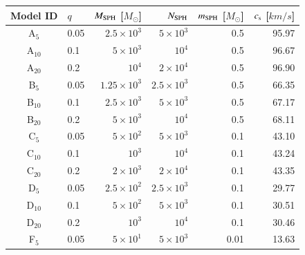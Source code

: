 \begin{table}[!h]
	\centering
	\renewcommand{\arraystretch}{0.95}
	\setlength{\tabcolsep}{4pt}
	\begin{tabular}{clrrrr}
		\hline
		\rowcolor[gray]{0.8}
		\textbf{Model ID} & $q$ & $M_{\rm SPH}$ [$M_\odot$] & $N_{\rm SPH}$ & $m_{\rm SPH}$ [$M_\odot$] & $c_{\rm s}$ [$km/s$]\\
		\hline
		
		\rowcolor[gray]{1}
		A$_{5}$ & 0.05  & $2.5 \times 10^3$  & $5 \times 10^3$  & 0.5  & 95.97 \\
		
		\rowcolor[gray]{1}
		A$_{10}$ & 0.1  & $5 \times 10^3$  & $10^4$  & 0.5  & 96.67 \\
		
		\rowcolor[gray]{1}
		A$_{20}$ & 0.2  & $ 10^4$  & $2 \times 10^4$  & 0.5  & 96.90 \\
		
		\rowcolor[gray]{0.9}
		B$_{5}$ & 0.05  & $1.25 \times 10^3$  & $2.5 \times 10^3$  & 0.5  & 66.35 \\
		
		\rowcolor[gray]{0.9}
		B$_{10}$ & 0.1  & $2.5 \times 10^3$  & $5 \times 10^3$  & 0.5  & 67.17 \\
		
		\rowcolor[gray]{0.9}
		B$_{20}$ & 0.2  & $5 \times 10^3$  & $10^4$  & 0.5  & 68.11 \\
		
		\rowcolor[gray]{1}
		C$_{5}$ & 0.05  & $5 \times 10^2$  & $5 \times 10^3$  & 0.1  & 43.10 \\
		
		\rowcolor[gray]{1}
		C$_{10}$ & 0.1  & $10^3$  & $10^4$  & 0.1  & 43.24 \\
		
		\rowcolor[gray]{1}
		C$_{20}$ & 0.2  & $2 \times 10^3$  & $2 \times 10^4$  & 0.1  & 43.35 \\
		
		\rowcolor[gray]{0.9}
		D$_{5}$ & 0.05  & $2.5 \times 10^2$  & $2.5 \times 10^3$  & 0.1  & 29.77 \\
		
		\rowcolor[gray]{0.9}
		D$_{10}$ & 0.1  & $5 \times 10^2$  & $5 \times 10^3$  & 0.1  & 30.51 \\
		
		\rowcolor[gray]{0.9}
		D$_{20}$ & 0.2  & $10^3$  & $10^4$  & 0.1  & 30.46 \\
		
		\rowcolor[gray]{1}
		F$_{5}$ & 0.05  & $5 \times 10^1$  & $5 \times 10^3$  & 0.01  & 13.63 \\
		

\end{tabular}
\end{table}
